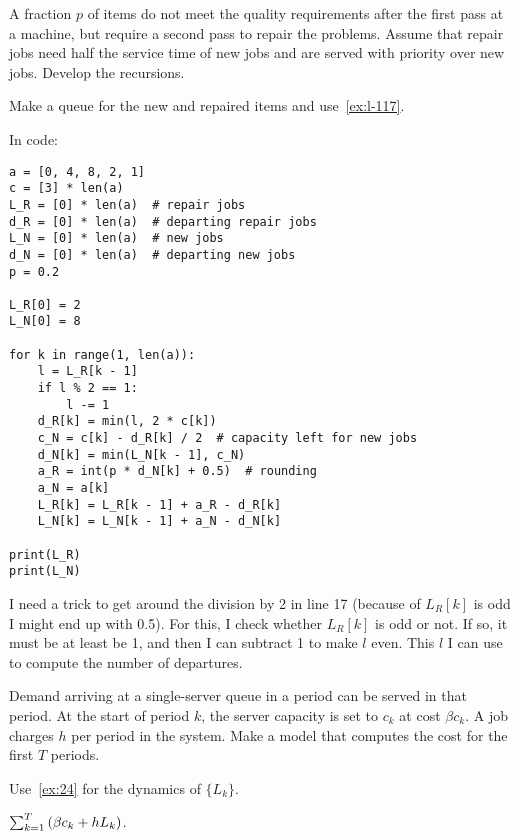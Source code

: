\begin{exercise}\label{ex:52}
A fraction $p$    of  items do not meet the quality requirements after the first pass at a machine, but require a second pass to repair the problems.
  Assume that  repair jobs need half the service time of new jobs and are served with priority over new jobs.
Develop the recursions.
\begin{hint}
  Make a queue for the new and repaired items and use~\cref{ex:l-117}.
\end{hint}
\begin{solution}
In code:
\begin{verbatim}
a = [0, 4, 8, 2, 1]
c = [3] * len(a)
L_R = [0] * len(a)  # repair jobs
d_R = [0] * len(a)  # departing repair jobs
L_N = [0] * len(a)  # new jobs
d_N = [0] * len(a)  # departing new jobs
p = 0.2

L_R[0] = 2
L_N[0] = 8

for k in range(1, len(a)):
    l = L_R[k - 1]
    if l % 2 == 1:
        l -= 1
    d_R[k] = min(l, 2 * c[k])
    c_N = c[k] - d_R[k] / 2  # capacity left for new jobs
    d_N[k] = min(L_N[k - 1], c_N)
    a_R = int(p * d_N[k] + 0.5)  # rounding
    a_N = a[k]
    L_R[k] = L_R[k - 1] + a_R - d_R[k]
    L_N[k] = L_N[k - 1] + a_N - d_N[k]

print(L_R)
print(L_N)
\end{verbatim}
I need a trick to get around the division by 2 in line 17 (because of $L_R[k]$ is odd I might end up with 0.5).
For this, I check whether $L_{R}[k]$ is odd or not.
If so, it must be at least be 1, and then I can subtract 1 to make $l$ even.
This $l$ I can use to compute the number of departures.

\end{solution}
\end{exercise}





\begin{exercise}\label{ex:l-116}
Demand
arriving at a single-server queue in a period can be served in that period.
At the start of  period $k$, the server capacity is set to $c_k$ at cost $\beta c_k$.
A job charges $h$ per period in the  system.
Make a  model that computes the cost for the first $T$ periods.
\begin{hint}
  Use~\cref{ex:24} for the dynamics of $\{L_k\}$.
\end{hint}
\begin{solution} $\sum_{k=1}^T \left(\beta c_k + h L_k\right)$.
\end{solution}
\end{exercise}


